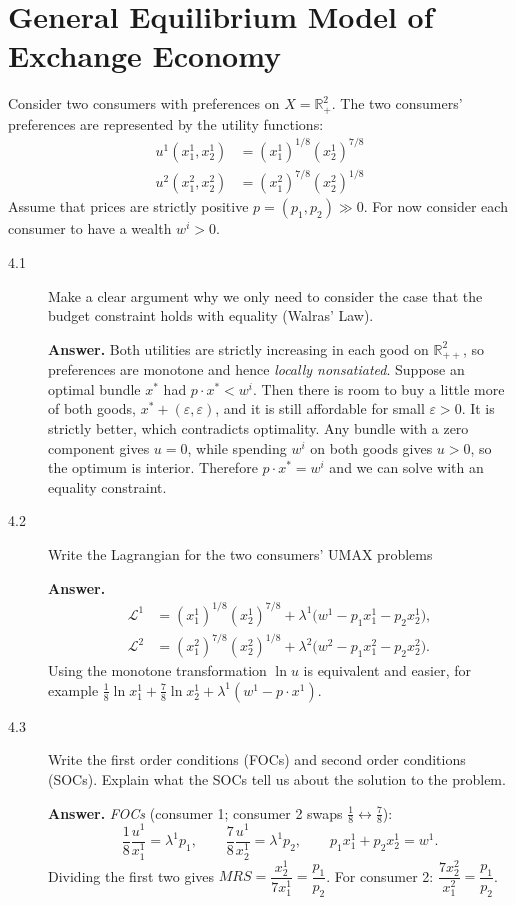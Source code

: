 \documentclass[11pt]{article}
\newenvironment{solution}{\par\smallskip\noindent\textbf{Answer.} }{\par\medskip}
\begin{document}
\section{General Equilibrium Model of Exchange Economy}

\noindent Consider two consumers with preferences on $X=\mathbb{R}^2_+$. The two consumers' preferences are represented by the utility functions:
\begin{align*}
u^1(x_1^1,x_2^1) &= \left(x_1^1\right)^{1/8}\left(x_2^1\right)^{7/8}\\
u^2(x_1^2,x_2^2) &= \left(x_1^2\right)^{7/8}\left(x_2^2\right)^{1/8}
\end{align*}
Assume that prices are strictly positive $p=(p_1,p_2)\gg 0$. For now consider each consumer to have a wealth $w^i>0$.

\begin{description}
\item[4.1] Make a clear argument why we only need to consider the case that the budget constraint holds with equality (Walras' Law).
\begin{solution}
Both utilities are strictly increasing in each good on $\mathbb{R}^2_{++}$, so preferences are monotone and hence \emph{locally nonsatiated}. Suppose an optimal bundle $x^*$ had $p\cdot x^*<w^i$. Then there is room to buy a little more of both goods, $x^*+(\varepsilon,\varepsilon)$, and it is still affordable for small $\varepsilon>0$. It is strictly better, which contradicts optimality. Any bundle with a zero component gives $u=0$, while spending $w^i$ on both goods gives $u>0$, so the optimum is interior. Therefore $p\cdot x^*=w^i$ and we can solve with an equality constraint.
\end{solution}

\item[4.2] Write the Lagrangian for the two consumers' UMAX problems
\begin{solution}
\begin{align*}
\mathcal{L}^1&=\left(x_1^1\right)^{1/8}\left(x_2^1\right)^{7/8}+\lambda^1\big(w^1-p_1x_1^1-p_2x_2^1\big),\\
\mathcal{L}^2&=\left(x_1^2\right)^{7/8}\left(x_2^2\right)^{1/8}+\lambda^2\big(w^2-p_1x_1^2-p_2x_2^2\big).
\end{align*}
Using the monotone transformation $\ln u$ is equivalent and easier, for example $\tfrac18\ln x_1^1+\tfrac78\ln x_2^1+\lambda^1(w^1-p\cdot x^1)$.
\end{solution}

\item[4.3] Write the first order conditions (FOCs) and second order conditions (SOCs). Explain what the SOCs tell us about the solution to the problem.
\begin{solution}
\emph{FOCs} (consumer 1; consumer 2 swaps $\tfrac18\leftrightarrow\tfrac78$):
\[
\frac{1}{8}\frac{u^1}{x_1^1}=\lambda^1 p_1,\qquad \frac{7}{8}\frac{u^1}{x_2^1}=\lambda^1 p_2,\qquad p_1x_1^1+p_2x_2^1=w^1.
\]
Dividing the first two gives $MRS=\dfrac{x_2^1}{7x_1^1}=\dfrac{p_1}{p_2}$. For consumer 2: $\dfrac{7x_2^2}{x_1^2}=\dfrac{p_1}{p_2}$.


\end{solution}
\end{description}
\end{document}

